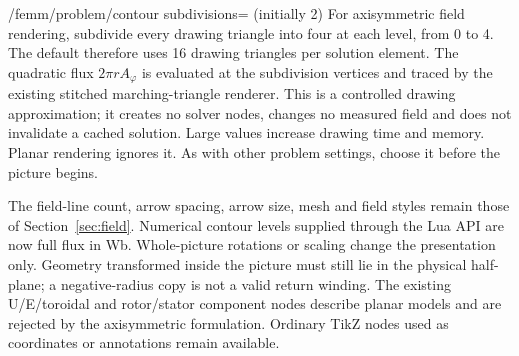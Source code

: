 \begin{key}{/femm/problem/contour subdivisions= (initially 2)}
For axisymmetric field rendering, subdivide every drawing triangle into four
at each level, from 0 to 4. The default therefore uses 16 drawing triangles
per solution element. The quadratic flux $2\pi rA_\varphi$ is evaluated at the
subdivision vertices and traced by the existing stitched marching-triangle
renderer. This is a controlled drawing approximation; it creates no solver
nodes, changes no measured field and does not invalidate a cached solution.
Large values increase drawing time and memory. Planar rendering ignores it.
As with other problem settings, choose it before the picture begins.
\end{key}

The field-line count, arrow spacing, arrow size, mesh and field styles remain
those of Section~\ref{sec:field}. Numerical contour levels supplied through the
Lua API are now full flux in Wb. Whole-picture rotations or scaling change the
presentation only. Geometry transformed inside the picture must still lie in
the physical half-plane; a negative-radius copy is not a valid return winding.
The existing U/E/toroidal and rotor/stator component nodes describe planar
models and are rejected by the axisymmetric formulation. Ordinary TikZ
nodes used as coordinates or annotations remain available.

